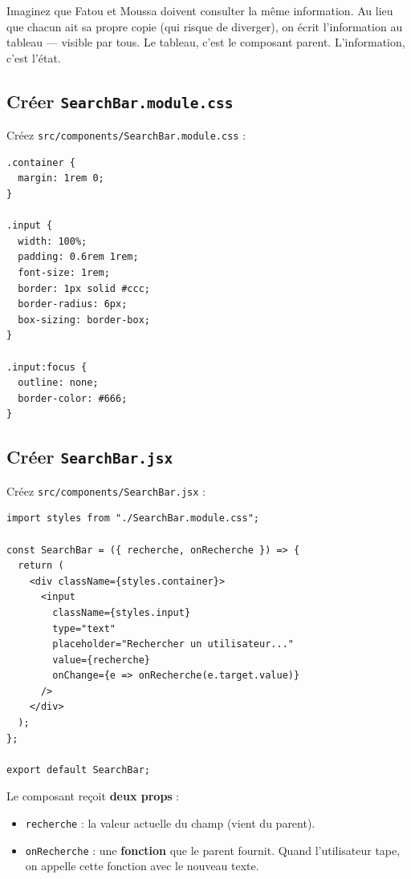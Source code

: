 \documentclass[11pt,a4paper]{article}
\begin{document}
\begin{infobox}
Imaginez que Fatou et Moussa doivent consulter la même information. Au lieu que chacun ait sa propre copie (qui risque de diverger), on écrit l'information au tableau --- visible par tous. Le tableau, c'est le composant parent. L'information, c'est l'état.
\end{infobox}

\subsection{Créer \texttt{SearchBar.module.css}}

Créez \texttt{src/components/SearchBar.module.css} :

\begin{lstlisting}[style=css]
.container {
  margin: 1rem 0;
}

.input {
  width: 100%;
  padding: 0.6rem 1rem;
  font-size: 1rem;
  border: 1px solid #ccc;
  border-radius: 6px;
  box-sizing: border-box;
}

.input:focus {
  outline: none;
  border-color: #666;
}
\end{lstlisting}

\subsection{Créer \texttt{SearchBar.jsx}}

Créez \texttt{src/components/SearchBar.jsx} :

\begin{lstlisting}
import styles from "./SearchBar.module.css";

const SearchBar = ({ recherche, onRecherche }) => {
  return (
    <div className={styles.container}>
      <input
        className={styles.input}
        type="text"
        placeholder="Rechercher un utilisateur..."
        value={recherche}
        onChange={e => onRecherche(e.target.value)}
      />
    </div>
  );
};

export default SearchBar;
\end{lstlisting}

Le composant reçoit \textbf{deux props} :
\begin{itemize}[nosep]
    \item \texttt{recherche} : la valeur actuelle du champ (vient du parent).
    \item \texttt{onRecherche} : une \textbf{fonction} que le parent fournit. Quand l'utilisateur tape, on appelle cette fonction avec le nouveau texte.
\end{itemize}
\end{document}
